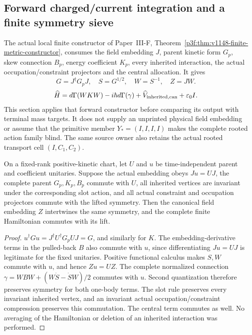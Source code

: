 \documentclass[12pt,a4paper]{article}
\begin{document}
\subsection{Forward charged/current integration and a finite symmetry sieve}
\label{p4:v251:sec:packet}

The actual local finite constructor of Paper~III-F,
Theorem~\ref{p3f:thm:v1148-finite-metric-constructor}, consumes the field
embedding $J$, parent kinetic form $G_p$, skew connection $B_p$,
energy coefficient $K_p$, every inherited interaction, the actual
occupation/constraint projectors and the central allocation. It gives
\[
 G=J^\dagger G_pJ,\quad S=G^{1/2},\quad W=S^{-1},\quad Z=JW.
\]
\[
 \widehat H=d\Gamma(WKW)-i\hbar d\Gamma(\gamma)
           +\widehat V_{\rm inherited,can}+\varepsilon_0I.
\]
This section applies that forward constructor before comparing its output
with terminal mass targets. It does not supply an unprinted physical field
embedding or assume that the primitive member $Y_*=(I,I,I,I)$ makes the
complete rooted action family blind. The same source owner also retains
the actual rooted transport cell $(I,C_1,C_2)$.

\begin{proposition}
\label{p4:v251:prop:symmetry-transport}
On a fixed-rank positive-kinetic chart, let $U$ and $u$ be time-independent
parent and coefficient unitaries. Suppose the actual embedding obeys
$Ju=UJ$, the complete parent $G_p,K_p,B_p$ commute with $U$, all inherited
vertices are invariant under the corresponding slot action, and all actual
constraint and occupation projectors commute with the lifted symmetry.
Then the canonical field embedding $Z$ intertwines the same symmetry,
and the complete finite Hamiltonian commutes with its lift.
\end{proposition}
\begin{proof}
$u^\dagger Gu=J^\dagger U^\dagger G_pUJ=G$, and similarly for $K$.
The embedding-derivative terms in the pulled-back $B$ also commute with
$u$, since differentiating $Ju=UJ$ is legitimate for the fixed unitaries.
Positive functional calculus makes $S,W$ commute with $u$, and hence
$Zu=UZ$. The complete normalized connection
$\gamma=WBW+(W\dot S-\dot SW)/2$ commutes with $u$.
Second quantization therefore preserves symmetry for both one-body terms.
The slot rule preserves every invariant inherited vertex, and an invariant
actual occupation/constraint compression preserves this commutation.
The central term commutes as well. No averaging of the Hamiltonian or
deletion of an inherited interaction was performed.
\end{proof}
\end{document}
